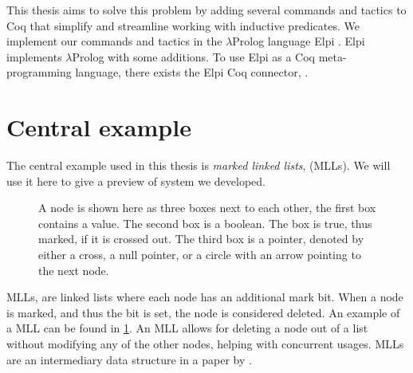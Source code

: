 \documentclass[thesis.tex]{subfiles}
\begin{document}
This thesis aims to solve this problem by adding several commands and tactics to Coq that simplify and streamline working with inductive predicates. We implement our commands and tactics in the $\lambda$Prolog language Elpi \cite{dunchevELPIFastEmbeddable2015,guidiImplementingTypeTheory2019}. Elpi implements $\lambda$Prolog \cite{millerHigherorderLogicProgramming1986,millerUniformProofsFoundation1991,belleanneePragmaticReconstructionLProlog1999,millerProgrammingHigherOrderLogic2012} with some additions. To use Elpi as a Coq meta-programming language, there exists the Elpi Coq connector, \ce \cite{tassiElpiExtensionLanguage2018}.

\section{Central example}
The central example used in this thesis is \emph{marked linked lists}, (MLLs). We will use it here to give a preview of system we developed.
\begin{figure}[t]
  \centering
  \caption{A node is shown here as three boxes next to each other, the first box contains a value. The second box is a boolean. The box is true, thus marked, if it is crossed out. The third box is a pointer, denoted by either a cross, a null pointer, or a circle with an arrow pointing to the next node.}
  \label{fig:MLLdiag}
\end{figure}

MLLs, are linked lists where each node has an additional mark bit. When a node is marked, and thus the bit is set, the node is considered deleted. An example of a MLL can be found in \cref{fig:MLLdiag}. An MLL allows for deleting a node out of a list without modifying any of the other nodes, helping with concurrent usages. MLLs are an intermediary data structure in a paper by  \cite{fomitchevLockfreeLinkedLists2004a}.
\end{document}
